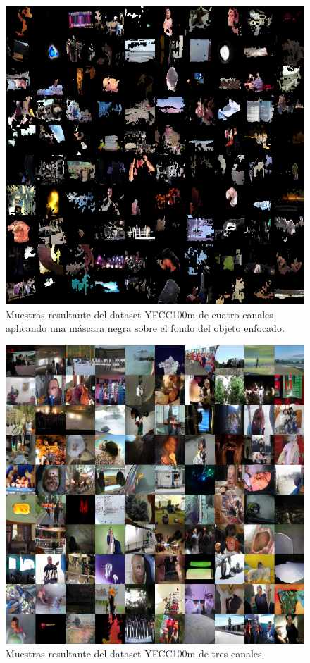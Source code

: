 \documentclass[spanish]{report}
\begin{document}
\begin{figure}[h]
\centering
 \includegraphics[width=\linewidth]{resultados/4chan_mask.png}
   \caption{Muestras resultante del dataset YFCC100m de cuatro canales aplicando una máscara negra sobre el fondo del objeto enfocado.}
  \label{fig:resultado_sin_filtrar3}
\end{figure}

\begin{figure}[h]
\centering
 \includegraphics[width=\linewidth]{resultados/3chan.png}
   \caption{Muestras resultante del dataset YFCC100m de tres canales.}
  \label{fig:resultado_sin_filtrar4}
\end{figure}



\printbibliography


\end{document}
